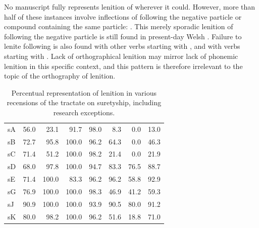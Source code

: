 No manuscript fully represents lenition of  wherever it could. However, more than half of these instances involve inflections of  following the negative particle  or compound containing the same particle: . This merely sporadic lenition of  following the negative particle is still found in present-day Welsh \autocite[695]{thomas_gramadeg_1996}. Failure to lenite following  is also found with other verbs starting with , and with verbs starting with . Lack of orthographical lenition may mirror lack of phonemic lenition in this specific context, and this pattern is therefore irrelevant to the topic of the orthography of lenition. 


\begin{table}[h]
  \centering
    \begin{tabular}{lddddddd}
    \toprule
     &  &  &  &  &  &  &  \\
      \midrule
      \gls{sA} & 56.0 & 23.1 & 91.7 & 98.0 & 8.3 & 0.0 & 13.0 \\
      \gls{sB} & 72.7 & 95.8 & 100.0 & 96.2 & 64.3 & 0.0 & 46.3 \\
      \gls{sC} & 71.4 & 51.2 & 100.0 & 98.2 & 21.4 & 0.0 & 21.9 \\
      \gls{sD} & 68.0 & 97.8 & 100.0 & 94.7 & 83.3 & 76.5 & 88.7 \\
      \gls{sE} & 71.4 & 100.0 & 83.3 & 96.2 & 96.2 & 58.8 & 92.9 \\
      \gls{sG} & 76.9 & 100.0 & 100.0 & 98.3 & 46.9 & 41.2 & 59.3 \\
      \gls{sJ} & 90.9 & 100.0 & 100.0 & 93.9 & 90.5 & 80.0 & 91.2 \\
      \gls{sK} & 80.0 & 98.2 & 100.0 & 96.2 & 51.6 & 18.8 & 71.0 \\
    \bottomrule
    \end{tabular}%
    \caption{Percentual representation of lenition in various recensions of the tractate on suretyship, including research exceptions.}
    \label{tab:lenlawcountryincre}%
\end{table}%


